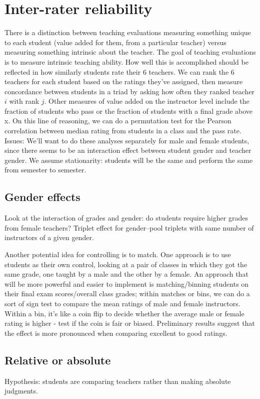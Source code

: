 \documentclass[12pt]{article}
\begin{document}
\section{Inter-rater reliability}
There is a distinction between teaching evaluations measuring something unique to each student 
(value added for them, from a particular teacher) versus 
measuring something intrinsic about the teacher.  
The goal of teaching evaluations is to measure intrinsic teaching ability.  
How well this is accomplished should be reflected in how similarly 
students rate their 6 teachers.
We can rank the 6 teachers for each student based on the ratings 
they've assigned, then measure concordance between students in a triad by asking how often they ranked teacher $i$ with rank $j$.
Other measures of value added on the instructor level include the fraction of 
students who pass or the fraction of students with a final grade above x.  
On this line of reasoning, we can do a permutation test for the 
Pearson correlation between median rating from students in a class and the pass rate.
Issues:
We'll want to do these analyses separately for male and female students, 
since there seems to be an interaction effect between student gender and teacher gender.
We assume stationarity: students will be the same and perform the same from semester to semester.

\subsection{Gender effects}
Look at the interaction of grades and gender: 
do students require higher grades from female teachers?
Triplet effect for gender--pool triplets with same number of instructors of a given gender.

Another potential idea for controlling is to match. 
One approach is to use students as their own control, looking at a pair of classes in which they got the same grade, one taught by a male and the other by a female. 
An approach that will be more powerful and easier to implement is matching/binning students on their final exam scores/overall class grades; within matches or bins, we can do a sort of sign test to compare the mean ratings of male and female instructors. 
Within a bin, it's like a coin flip to decide whether the average male or 
female rating is higher - test if the coin is fair or biased. 
Preliminary results suggest that the effect is more pronounced when comparing excellent to good ratings.

\subsection{Relative or absolute}
Hypothesis: students are comparing teachers rather than making absolute judgments.
\end{document}
